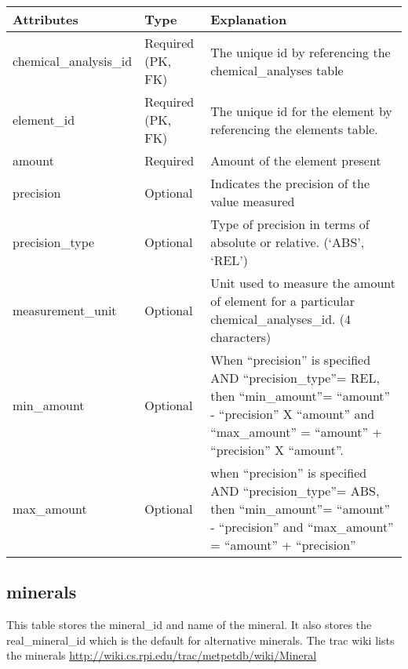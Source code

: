 \documentclass[letterpaper,10pt,english]{sphinxmanual}
\begin{document}
\begin{tabulary}{\linewidth}{|L|L|L|}
\hline
\textbf{
Attributes
} & \textbf{
Type
} & \textbf{
Explanation
}\\\hline

chemical\_analysis\_id
 & 
Required (PK, FK)
 & 
The unique id by referencing the chemical\_analyses table
\\\hline

element\_id
 & 
Required (PK, FK)
 & 
The unique id for the element by referencing the elements table.
\\\hline

amount
 & 
Required
 & 
Amount of the element present
\\\hline

precision
 & 
Optional
 & 
Indicates the precision of the value measured
\\\hline

precision\_type
 & 
Optional
 & 
Type of precision in terms of absolute or relative. (‘ABS’, ‘REL’)
\\\hline

measurement\_unit
 & 
Optional
 & 
Unit used to measure the amount of element for a particular
chemical\_analyses\_id. (4 characters)
\\\hline

min\_amount
 & 
Optional
 & 
When ``precision'' is specified AND ``precision\_type''= REL, then
``min\_amount''= ``amount'' - ``precision'' X ``amount'' and
``max\_amount'' = ``amount'' + ``precision'' X ``amount''.
\\\hline

max\_amount
 & 
Optional
 & 
when ``precision'' is specified AND ``precision\_type''= ABS, then
``min\_amount''= ``amount'' - ``precision''  and
``max\_amount'' = ``amount'' + ``precision''
\\\hline
\end{tabulary}



\subsection{minerals}
\label{Table_Description:minerals}
This table stores the mineral\_id and name of the mineral. It also stores the real\_mineral\_id which is the default for alternative minerals.
The trac wiki lists the minerals \href{http://wiki.cs.rpi.edu/trac/metpetdb/wiki/Mineral}{http://wiki.cs.rpi.edu/trac/metpetdb/wiki/Mineral}
\end{document}
